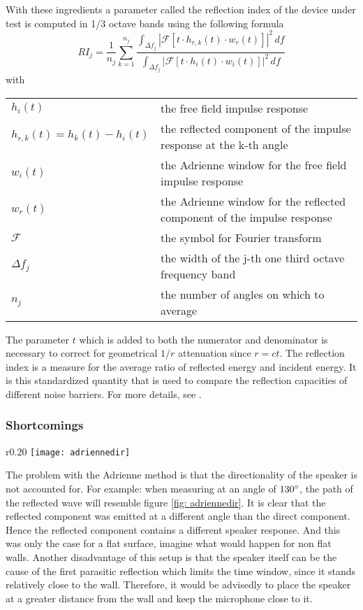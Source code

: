With these ingredients a parameter called the reflection index of the device under test is computed in 1/3 octave bands using the following formula 
\begin{equation}
RI_j = \frac{1}{n_j} \sum^{n_j}_{k=1} \frac{\int_{\Delta f_j} \left|\mathcal{F}\left[t\cdot h_{r,k}(t)\cdot w_r(t)\right]\right|^2 \,df }{\int_{\Delta f_j} \left|\mathcal{F}\left[t \cdot h_{i}(t) \cdot w_i(t)\right]\right|^2 \,df }
\label{RI}
\end{equation}
with \\

\begin{tabular}{ll}
$h_i(t)$ & the free field impulse response \\
$h_{r,k}(t) = h_k(t) - h_i(t)$ & the reflected component of the impulse response at the k-th angle \\
$w_i(t)$ & the Adrienne window for the free field impulse response\\ 
$w_r(t)$ & the Adrienne window for the reflected component of the impulse response\\ 
$\mathcal{F}$ & the symbol for Fourier transform \\
$\Delta f_j$ & the width of the j-th one third octave frequency band\\
$n_j$ & the number of angles on which to average\\ 
\end{tabular}

The parameter $t$ which is added to both the numerator and denominator is necessary to correct for geometrical $1/r$ attenuation since $r =c t$. 
The reflection index is a measure for the average ratio of reflected energy and incident energy. It is this standardized quantity that is used to compare the reflection capacities of different noise barriers. For more details, see \cite{Adrienne}.

\subsubsection{Shortcomings}
\begin{wrapfigure}{r}{0.20\textwidth}
	\vspace{-10pt}
  \centering
    \texttt{[image: adriennedir]}
  \caption{Path of the reflected wave.}
  \label{fig: adriennedir}
\end{wrapfigure}
The problem with the Adrienne method is that the directionality of the speaker is not accounted for. For example: when measuring at an angle of $130^{\circ}$, the path of the reflected wave will resemble figure \ref{fig: adriennedir}. It is clear that the reflected component was emitted at a different angle than the direct component. Hence the reflected component contains a different speaker response. And this was only the case for a flat surface, imagine what would happen for non flat walls. Another disadvantage of this setup is that the speaker itself can be the cause of the first parasitic reflection which limits the time window, since it stands relatively close to the wall. Therefore, it would be advisedly to place the speaker at a greater distance from the wall and keep the microphone close to it.


